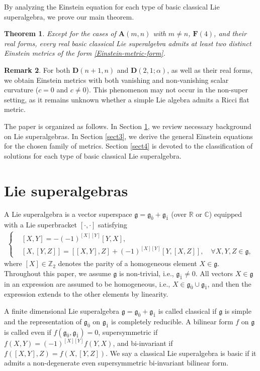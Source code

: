 \documentclass[reqno]{amsart}
\newtheorem{thm}{Theorem}[section]
\theoremstyle{definition}
\newtheorem{rem}[thm]{Remark}
\begin{document}
By analyzing the Einstein equation  for each type of basic classical Lie superalgebra, we prove our  main theorem.
\begin{thm}\label{1-thm-main}
Except for the cases of $\mathbf{A}(m,n)$ with $m\neq n$, $\mathbf{F}(4)$,  and their real forms, every  real basic classical Lie superalgebra
admits at least  two distinct Einstein metrics of the form \eqref{Einstein-metric-form}.
\end{thm}
\begin{rem}
For both $\mathbf{D}(n+1,n)$ and $\mathbf{D}(2,1;\alpha)$, as well as their real forms, we obtain Einstein metrics with both vanishing and non-vanishing scalar curvature ($c=0$ and $c\neq0$). This phenomenon may not occur in the non-super setting, as it remains unknown whether a simple Lie algebra admits a Ricci flat metric.
\end{rem}

The paper is organized as follows. In Section \ref{sect2}, we review necessary background on Lie superalgebras. In Section \ref{sect3}, we derive the general Einstein equations for the chosen family of metrics. Section \ref{sect4} is devoted to the classification of solutions for each type of basic classical Lie superalgebra.

\section{Lie superalgebras}\label{sect2}

A Lie superalgebra is a vector superspace $\mathfrak{g}=\mathfrak{g}_{\bar{0}}+\mathfrak{g}_{\bar{1}}$ (over $\mathbb{R}$ or $\mathbb{C}$) equipped with a Lie superbracket $[\cdot,\cdot]$ satisfying
\begin{eqnarray*}
\left\{
\begin{aligned}
&[X,Y]=-(-1)^{[X][Y]}[Y,X],\\
&[X,[Y,Z]]=[[X,Y],Z]+(-1)^{[X][Y]}[Y,[X,Z]],\quad \forall X,Y,Z\in\mathfrak{g},
\end{aligned}
\right.
\end{eqnarray*}
where $[X]\in \mathbb{Z}_{2}$ denotes the parity of a homogeneous element $X\in\mathfrak{g}$.
Throughout this paper, we assume $\mathfrak{g}$ is non-trivial, i.e., $\mathfrak{g}_{\bar{1}}\neq 0$.
 All vectors $X\in \mathfrak{g}$ in an expression are assumed to be homogeneous, i.e., $X\in\mathfrak{g}_{\bar{0}}\cup \mathfrak{g}_{\bar{1}}$, and then the expression extends to the other elements by linearity.

A finite dimensional Lie superalgebra $\mathfrak{g}=\mathfrak{g}_{\bar{0}}+\mathfrak{g}_{\bar{1}}$ is called classical if $\mathfrak{g}$ is simple and the representation of $\mathfrak{g}_{\bar{0}}$ on $\mathfrak{g}_{\bar{1}}$ is completely reducible. A bilinear form $f$ on $\mathfrak{g}$ is called even if $f(\mathfrak{g}_{\bar{0}},\mathfrak{g}_{\bar{1}})=0$, supersymmetric if $f(X,Y)=(-1)^{[X][Y]}f(Y,X)$, and bi-invariant if $f([X,Y],Z)=f(X,[Y,Z])$.
We say  a classical Lie superalgebra is basic if it admits a non-degenerate
even supersymmetric bi-invariant bilinear form.
\end{document}
